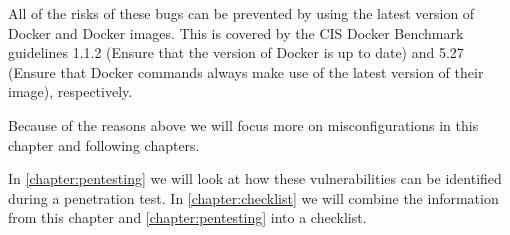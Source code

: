 All of the risks of these bugs can be prevented by using the latest version of Docker and Docker images. This is covered by the CIS Docker Benchmark guidelines 1.1.2 (Ensure that the version of Docker is up to date) and 5.27 (Ensure that Docker commands always make use of the latest version of their image), respectively.

Because of the reasons above we will focus more on misconfigurations in this chapter and following chapters.

\medskip

In \autoref{chapter:pentesting} we will look at how these vulnerabilities can be identified during a penetration test. In \autoref{chapter:checklist} we will combine the information from this chapter and \autoref{chapter:pentesting} into a checklist.



